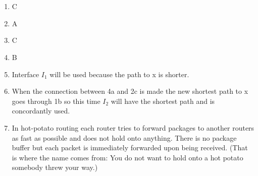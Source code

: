 \documentclass[12pt, a4paper]{article}
\begin{document}
\section{} %
\begin{enumerate}[1]
	\item %
	C

	\item %
	A

	\item %
	C

	\item %
	B

	\item %
	Interface $I_1$ will be used because the path to x is shorter.

	\item %
	When the connection between 4a and 2c is made the new shortest path to x goes through 1b so this time $I_2$ will have the shortest path and is concordantly used.

	\item %
	In hot-potato routing each router tries to forward packages to another routers as fast as possible and does not hold onto anything. There is no package buffer but each packet is immediately forwarded upon being received. (That is where the name comes from: You do not want to hold onto a hot potato somebody threw your way.)
\end{enumerate}

\section{} %
\end{document}

